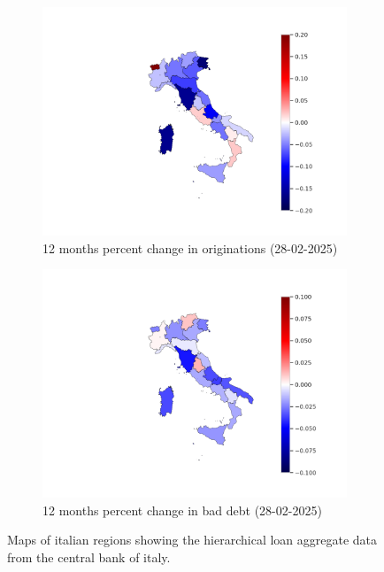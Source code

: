 \documentclass[letterpaper]{article}
\begin{document}
\begin{figure}
    \centering
     \begin{subfigure}[b]{0.47\textwidth}
         \centering
         \includegraphics[width=\textwidth]{bad_loans_map.png}
         \caption{12 months percent change in originations (28-02-2025)}
         \label{fig:y equals x}
     \end{subfigure}
     \hfill
     \begin{subfigure}[b]{0.47\textwidth}
         \centering
         \includegraphics[width=\textwidth]{orig_loans_map.png}
         \caption{12 months percent change in bad debt (28-02-2025)}
         \label{fig:three sin x}
     \end{subfigure}
     \hfill
        \caption{Maps of italian regions showing the hierarchical loan aggregate data from the central bank of italy.}
        \label{fig:maps}
\end{figure}
\end{document}
